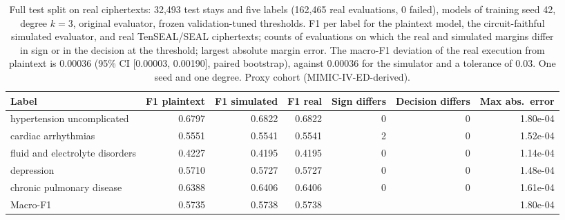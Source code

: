 \begin{table}[t]
\centering
\caption{Full test split on real ciphertexts: 32,493 test stays and five labels (162,465 real evaluations, 0 failed), models of training seed 42, degree $k=3$, original evaluator, frozen validation-tuned thresholds. F1 per label for the plaintext model, the circuit-faithful simulated evaluator, and real TenSEAL/SEAL ciphertexts; counts of evaluations on which the real and simulated margins differ in sign or in the decision at the threshold; largest absolute margin error. The macro-F1 deviation of the real execution from plaintext is 0.00036 (95\% CI [0.00003, 0.00190], paired bootstrap), against 0.00036 for the simulator and a tolerance of 0.03. One seed and one degree. Proxy cohort (MIMIC-IV-ED-derived).}
\label{tab:t10_real_full_split}
\begin{tabular}{lrrrrrr}
\toprule
Label & F1 plaintext & F1 simulated & F1 real & Sign differs & Decision differs & Max abs.\ error \\
\midrule
hypertension uncomplicated & 0.6797 & 0.6822 & 0.6822 & 0 & 0 & 1.80e-04 \\
cardiac arrhythmias & 0.5551 & 0.5541 & 0.5541 & 2 & 0 & 1.52e-04 \\
fluid and electrolyte disorders & 0.4227 & 0.4195 & 0.4195 & 0 & 0 & 1.14e-04 \\
depression & 0.5710 & 0.5727 & 0.5727 & 0 & 0 & 1.48e-04 \\
chronic pulmonary disease & 0.6388 & 0.6406 & 0.6406 & 0 & 0 & 1.61e-04 \\
\midrule
Macro-F1 & 0.5735 & 0.5738 & 0.5738 & & & 1.80e-04 \\
\bottomrule
\end{tabular}
\end{table}
